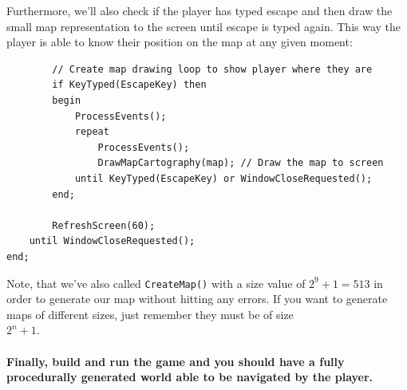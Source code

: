 \documentclass{article}
\begin{document}
Furthermore, we'll also check if the player has typed escape and then draw the small map representation to the screen until escape is typed again. This way the player is able to know their position on the map at any given moment:

\begin{verbatim}
		// Create map drawing loop to show player where they are
		if KeyTyped(EscapeKey) then
		begin
			ProcessEvents();
			repeat
				ProcessEvents();
				DrawMapCartography(map); // Draw the map to screen
			until KeyTyped(EscapeKey) or WindowCloseRequested();
		end;

		RefreshScreen(60);
	until WindowCloseRequested();
end;
\end{verbatim}

Note, that we've also called \texttt{CreateMap()} with a size value of $2^{9}+1 = 513$ in order to generate our map without hitting any errors. If you want to generate maps of different sizes, just remember they must be of size 
\\
$2^{n}+1$.

\paragraph{Finally, build and run the game and you should have a fully procedurally generated world able to be navigated by the player.}
\end{document}
